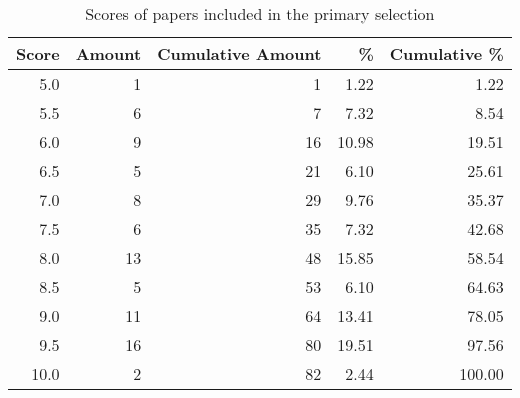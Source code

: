 
\begin{table}[htb!]
	\caption{Scores of papers included in the primary selection}
	\begin{tabular}{@{}rrrrr@{}}
		\toprule
		Score & Amount & Cumulative Amount &    \% & Cumulative \% \\		\midrule
		  5.0 &      1 &                 1 &  1.22 &          1.22 \\
		  5.5 &      6 &                 7 &  7.32 &          8.54 \\
		  6.0 &      9 &                16 & 10.98 &         19.51 \\
		  6.5 &      5 &                21 &  6.10 &         25.61 \\
		  7.0 &      8 &                29 &  9.76 &         35.37 \\
		  7.5 &      6 &                35 &  7.32 &         42.68 \\
		  8.0 &     13 &                48 & 15.85 &         58.54 \\
		  8.5 &      5 &                53 &  6.10 &         64.63 \\
		  9.0 &     11 &                64 & 13.41 &         78.05 \\
		  9.5 &     16 &                80 & 19.51 &         97.56 \\
		 10.0 &      2 &                82 &  2.44 &        100.00 \\
		\bottomrule
	\end{tabular}
	\label{tab:scores}
\end{table}
